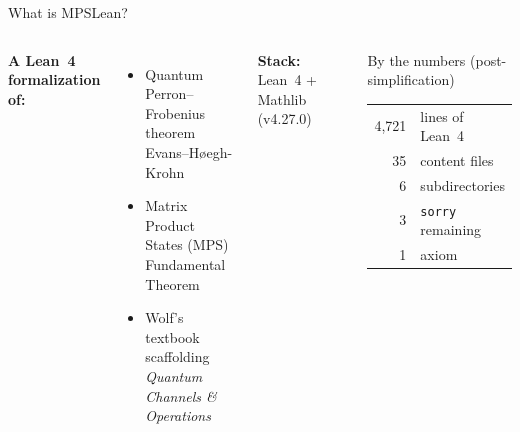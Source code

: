 \documentclass[aspectratio=169,10pt]{beamer}
\begin{document}
\begin{frame}{What is MPSLean?}
    \begin{columns}[T]
        \textbf{A Lean~4 formalization of:}
        \begin{itemize}\itemsep0.3em
            \item \textcolor{leangreen}{Quantum Perron--Frobenius theorem}\\
                  {\small Evans--H\o egh-Krohn \cite{Evans1978Spectral}}
            \item \textcolor{leangreen}{Matrix Product States (MPS)}\\
                  {\small Fundamental Theorem \cite{Perez-Garcia2007Matrix}}
            \item \textcolor{leanblue}{Wolf's textbook scaffolding}\\
                  {\small \emph{Quantum Channels \& Operations} \cite{Wolf2012Quantum}}
        \end{itemize}

        \vspace{0.5em}
        \textbf{Stack:} Lean~4 + Mathlib (v4.27.0)

        \begin{block}{\small By the numbers (post-simplification)}
            \begin{tabular}{rl}
                \textcolor{leangreen}{4{,}721} & lines of Lean~4 \\
                \textcolor{leangreen}{35}      & content files \\
                \textcolor{leangreen}{6}       & subdirectories \\
                \textcolor{amber}{3}           & \texttt{sorry} remaining \\
                \textcolor{softred}{1}         & axiom \\
            \end{tabular}
        \end{block}
    \end{columns}
\end{frame}
\end{document}
